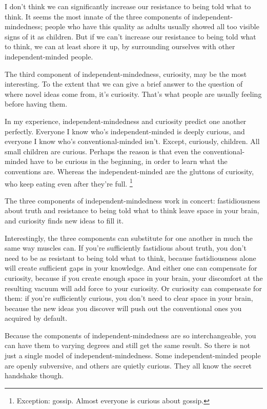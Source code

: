 \documentclass[12pt]{book}
\begin{document}
I don't think we can significantly increase our resistance to being told
what to think. It seems the most innate of the three components of
independent-mindedness; people who have this quality as adults usually
showed all too visible signs of it as children. But if we can't increase
our resistance to being told what to think, we can at least shore it up,
by surrounding ourselves with other independent-minded people.

The third component of independent-mindedness, curiosity, may be the
most interesting. To the extent that we can give a brief answer to the
question of where novel ideas come from, it's curiosity. That's what
people are usually feeling before having them.

In my experience, independent-mindedness and curiosity predict one
another perfectly. Everyone I know who's independent-minded is deeply
curious, and everyone I know who's conventional-minded isn't. Except,
curiously, children. All small children are curious. Perhaps the reason
is that even the conventional-minded have to be curious in the
beginning, in order to learn what the conventions are. Whereas the
independent-minded are the gluttons of curiosity, who keep eating even
after they're full. \footnote{Exception: gossip. Almost everyone is curious about gossip.}

The three components of independent-mindedness work in concert:
fastidiousness about truth and resistance to being told what to think
leave space in your brain, and curiosity finds new ideas to fill it.

Interestingly, the three components can substitute for one another in
much the same way muscles can. If you're sufficiently fastidious about
truth, you don't need to be as resistant to being told what to think,
because fastidiousness alone will create sufficient gaps in your
knowledge. And either one can compensate for curiosity, because if you
create enough space in your brain, your discomfort at the resulting
vacuum will add force to your curiosity. Or curiosity can compensate for
them: if you're sufficiently curious, you don't need to clear space in
your brain, because the new ideas you discover will push out the
conventional ones you acquired by default.

Because the components of independent-mindedness are so interchangeable,
you can have them to varying degrees and still get the same result. So
there is not just a single model of independent-mindedness. Some
independent-minded people are openly subversive, and others are quietly
curious. They all know the secret handshake though.
\end{document}
